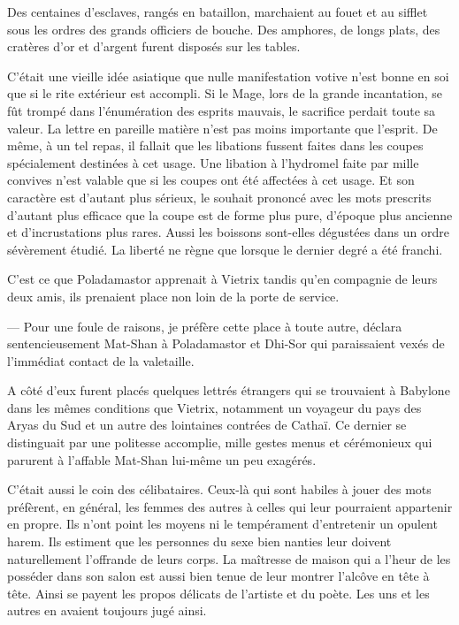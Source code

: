 \documentclass[a4paper, 11pt, oneside, polutonikogreek, french]{article}
\begin{document}
\bigskip
\centerline{\EightStarTaper}
\centerline{\EightStarTaper\EightStarTaper}
\bigskip

Des centaines d'esclaves, rangés en bataillon, marchaient au fouet et au sifflet sous les ordres des grands officiers de bouche. Des amphores, de longs plats, des cratères d'or et d'argent furent disposés sur les tables.

C'était une vieille idée asiatique que nulle manifestation votive n'est bonne en soi que si le rite extérieur est accompli. Si le Mage, lors de la grande incantation, se fût trompé dans l'énumération des esprits mauvais, le sacrifice perdait toute sa valeur. La lettre en pareille matière n'est pas moins importante que l'esprit. De même, à un tel repas, il fallait que les libations fussent faites dans les coupes spécialement destinées à cet usage. Une libation à l'hydromel faite par mille convives n'est valable que si les coupes ont été affectées à cet usage. Et son caractère est d'autant plus sérieux, le souhait prononcé avec les mots prescrits d'autant plus efficace que la coupe est de forme plus pure, d'époque plus ancienne et d'incrustations plus rares. Aussi les boissons sont-elles dégustées dans un ordre sévèrement étudié. La liberté ne règne que lorsque le dernier degré a été franchi.

C'est ce que Poladamastor apprenait à Vietrix tandis qu'en compagnie de leurs deux amis, ils prenaient place non loin de la porte de service.

--- Pour une foule de raisons, je préfère cette place à toute autre, déclara sentencieusement Mat-Shan à Poladamastor et Dhi-Sor qui paraissaient vexés de l'immédiat contact de la valetaille.

A côté d'eux furent placés quelques lettrés étrangers qui se trouvaient à Babylone dans les mêmes conditions que Vietrix, notamment un voyageur du pays des Aryas du Sud et un autre des lointaines contrées de Cathaï. Ce dernier se distinguait par une politesse accomplie, mille gestes menus et cérémonieux qui parurent à l'affable Mat-Shan lui-même un peu exagérés.

C'était aussi le coin des célibataires. Ceux-là qui sont habiles à jouer des mots préfèrent, en général, les femmes des autres à celles qui leur pourraient appartenir en propre. Ils n'ont point les moyens ni le tempérament d'entretenir un opulent harem. Ils estiment que les personnes du sexe bien nanties leur doivent naturellement l'offrande de leurs corps. La maîtresse de maison qui a l'heur de les posséder dans son salon est aussi bien tenue de leur montrer l'alcôve en tête à tête. Ainsi se payent les propos délicats de l'artiste et du poète. Les uns et les autres en avaient toujours jugé ainsi.
\end{document}
